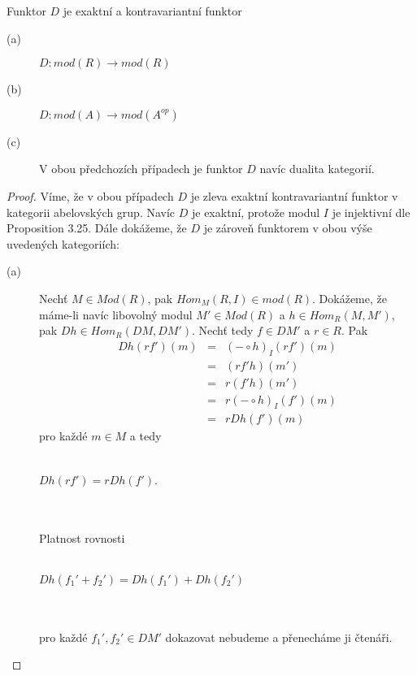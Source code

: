      \begin{thm}\label{lem-dual}
       Funktor $D$ je exaktní a kontravariantní funktor 
       \begin{description}
         \item[(a)] $D:mod(R)\rightarrow mod(R)$ 
         \item[(b)] $D:mod(A)\rightarrow mod(A^{op})$ 
         \item[(c)] V obou předchozích případech je funktor $D$ navíc dualita kategorií.
       \end{description}
     \end{thm}
     \begin{proof}
         Víme, že v obou případech $D$ je zleva exaktní kontravariantní funktor 
         v kategorii abelovských grup. Navíc $D$ je exaktní, protože
       modul $I$  je injektivní dle \cite{5} Proposition 3.25. Dále dokážeme, že 
       $D$ je zároveň funktorem v obou výše uvedených kategoriích:
        
       \begin{description}
         
         \item[(a)] Nechť $M\in Mod(R)$, pak $Hom_M(R,I)\in mod(R)$. Dokážeme,
         že máme-li navíc libovolný modul $M'\in Mod(R)$ a $h\in Hom_R(M,M')$, pak $Dh\in 
         Hom_R(DM,DM')$.
         Nechť tedy $f\in DM'$ a $r\in R$. Pak
         \begin{eqnarray}
           Dh(rf')(m) &=& (-\circ h)_I(rf')(m)\nonumber \\
           &=& (rf'h)(m') \nonumber \\ 
           &=& r(f'h)(m')\nonumber \\
           &=& r(-\circ h)_I(f')(m)\nonumber \\
           &=& rDh(f')(m)\nonumber
         \end{eqnarray}
         pro každé $m\in M$ a tedy \\\\
         \centerline{$Dh(rf')=rDh(f')$.}\\\\
         Platnost rovnosti \\\\
         \centerline{$Dh(f_1'+f_2')=Dh(f_1')+Dh(f_2')$}\\\\
         pro každé $f_1',f_2'\in DM'$ dokazovat nebudeme a přenecháme ji 
         čtenáři.
                  

\end{description}
\end{proof}
